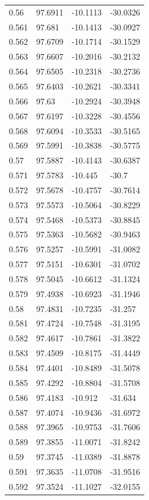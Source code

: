 \begin{tabular}{llll}
0.56 & 97.6911 & -10.1113 & -30.0326 \\
0.561 & 97.681 & -10.1413 & -30.0927 \\
0.562 & 97.6709 & -10.1714 & -30.1529 \\
0.563 & 97.6607 & -10.2016 & -30.2132 \\
0.564 & 97.6505 & -10.2318 & -30.2736 \\
0.565 & 97.6403 & -10.2621 & -30.3341 \\
0.566 & 97.63 & -10.2924 & -30.3948 \\
0.567 & 97.6197 & -10.3228 & -30.4556 \\
0.568 & 97.6094 & -10.3533 & -30.5165 \\
0.569 & 97.5991 & -10.3838 & -30.5775 \\
0.57 & 97.5887 & -10.4143 & -30.6387 \\
0.571 & 97.5783 & -10.445 & -30.7 \\
0.572 & 97.5678 & -10.4757 & -30.7614 \\
0.573 & 97.5573 & -10.5064 & -30.8229 \\
0.574 & 97.5468 & -10.5373 & -30.8845 \\
0.575 & 97.5363 & -10.5682 & -30.9463 \\
0.576 & 97.5257 & -10.5991 & -31.0082 \\
0.577 & 97.5151 & -10.6301 & -31.0702 \\
0.578 & 97.5045 & -10.6612 & -31.1324 \\
0.579 & 97.4938 & -10.6923 & -31.1946 \\
0.58 & 97.4831 & -10.7235 & -31.257 \\
0.581 & 97.4724 & -10.7548 & -31.3195 \\
0.582 & 97.4617 & -10.7861 & -31.3822 \\
0.583 & 97.4509 & -10.8175 & -31.4449 \\
0.584 & 97.4401 & -10.8489 & -31.5078 \\
0.585 & 97.4292 & -10.8804 & -31.5708 \\
0.586 & 97.4183 & -10.912 & -31.634 \\
0.587 & 97.4074 & -10.9436 & -31.6972 \\
0.588 & 97.3965 & -10.9753 & -31.7606 \\
0.589 & 97.3855 & -11.0071 & -31.8242 \\
0.59 & 97.3745 & -11.0389 & -31.8878 \\
0.591 & 97.3635 & -11.0708 & -31.9516 \\
0.592 & 97.3524 & -11.1027 & -32.0155 \\

\end{tabular}
